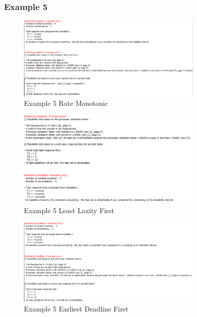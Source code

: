 \documentclass{article}
\begin{document}
\subsubsection*{Example 5}
\begin{figure}[H]
    \centering
    \includegraphics[width=0.8\textwidth]{5_RM.png}
    \caption{Example 5 Rate Monotonic}
\end{figure}
\begin{figure}[H]
    \centering
    \includegraphics[width=0.8\textwidth]{5_LLF.png}
    \caption{Example 5 Least Laxity First}
\end{figure}
\begin{figure}[H]
    \centering
    \includegraphics[width=0.8\textwidth]{5_EDF.png}
    \caption{Example 5 Earliest Deadline First}
\end{figure}
\end{document}
